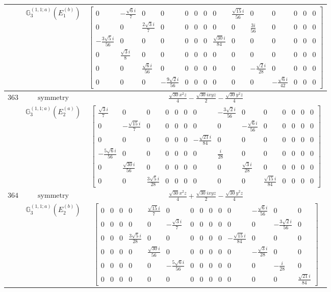 \documentclass[fleqn,8pt,landscape]{jsarticle}
\begin{document}
\begin{longtable}{ccc}
$  $ & $ \mathbb{G}_{3}^{(1,1;a)}(E_{1}^{(b)}) $ & $ \begin{bmatrix} 0 & - \frac{\sqrt{6} i}{7} & 0 & 0 & 0 & 0 & 0 & 0 & \frac{\sqrt{15} i}{56} & 0 & 0 & 0 & 0 & 0 \\ 0 & 0 & \frac{2 \sqrt{3} i}{7} & 0 & 0 & 0 & 0 & 0 & 0 & \frac{3 i}{56} & 0 & 0 & 0 & 0 \\ - \frac{3 \sqrt{5} i}{56} & 0 & 0 & 0 & 0 & 0 & 0 & \frac{\sqrt{30} i}{84} & 0 & 0 & 0 & 0 & 0 & 0 \\ 0 & \frac{\sqrt{3} i}{8} & 0 & 0 & 0 & 0 & 0 & 0 & 0 & 0 & 0 & 0 & 0 & 0 \\ 0 & 0 & \frac{\sqrt{6} i}{56} & 0 & 0 & 0 & 0 & 0 & 0 & - \frac{\sqrt{2} i}{28} & 0 & 0 & 0 & 0 \\ 0 & 0 & 0 & - \frac{9 \sqrt{2} i}{56} & 0 & 0 & 0 & 0 & 0 & 0 & - \frac{\sqrt{6} i}{42} & 0 & 0 & 0 \end{bmatrix} $ \\ \hline
$ 363 $ & $ \text{symmetry} $ & $ \frac{\sqrt{30} x^{2} z}{4} - \frac{\sqrt{30} i x y z}{2} - \frac{\sqrt{30} y^{2} z}{4} $ \\
$  $ & $ \mathbb{G}_{3}^{(1,1;a)}(E_{2}^{(a)}) $ & $ \begin{bmatrix} \frac{\sqrt{3} i}{7} & 0 & 0 & 0 & 0 & 0 & 0 & - \frac{3 \sqrt{2} i}{56} & 0 & 0 & 0 & 0 & 0 & 0 \\ 0 & - \frac{\sqrt{15} i}{7} & 0 & 0 & 0 & 0 & 0 & 0 & - \frac{\sqrt{6} i}{56} & 0 & 0 & 0 & 0 & 0 \\ 0 & 0 & 0 & 0 & 0 & 0 & - \frac{\sqrt{21} i}{84} & 0 & 0 & 0 & 0 & 0 & 0 & 0 \\ - \frac{5 \sqrt{6} i}{56} & 0 & 0 & 0 & 0 & 0 & 0 & \frac{i}{28} & 0 & 0 & 0 & 0 & 0 & 0 \\ 0 & \frac{\sqrt{30} i}{56} & 0 & 0 & 0 & 0 & 0 & 0 & \frac{\sqrt{3} i}{28} & 0 & 0 & 0 & 0 & 0 \\ 0 & 0 & \frac{3 \sqrt{5} i}{28} & 0 & 0 & 0 & 0 & 0 & 0 & \frac{\sqrt{15} i}{84} & 0 & 0 & 0 & 0 \end{bmatrix} $ \\ \hline
$ 364 $ & $ \text{symmetry} $ & $ \frac{\sqrt{30} x^{2} z}{4} + \frac{\sqrt{30} i x y z}{2} - \frac{\sqrt{30} y^{2} z}{4} $ \\
$  $ & $ \mathbb{G}_{3}^{(1,1;a)}(E_{2}^{(b)}) $ & $ \begin{bmatrix} 0 & 0 & 0 & 0 & \frac{\sqrt{15} i}{7} & 0 & 0 & 0 & 0 & 0 & 0 & - \frac{\sqrt{6} i}{56} & 0 & 0 \\ 0 & 0 & 0 & 0 & 0 & - \frac{\sqrt{3} i}{7} & 0 & 0 & 0 & 0 & 0 & 0 & - \frac{3 \sqrt{2} i}{56} & 0 \\ 0 & 0 & 0 & \frac{3 \sqrt{5} i}{28} & 0 & 0 & 0 & 0 & 0 & 0 & - \frac{\sqrt{15} i}{84} & 0 & 0 & 0 \\ 0 & 0 & 0 & 0 & \frac{\sqrt{30} i}{56} & 0 & 0 & 0 & 0 & 0 & 0 & - \frac{\sqrt{3} i}{28} & 0 & 0 \\ 0 & 0 & 0 & 0 & 0 & - \frac{5 \sqrt{6} i}{56} & 0 & 0 & 0 & 0 & 0 & 0 & - \frac{i}{28} & 0 \\ 0 & 0 & 0 & 0 & 0 & 0 & 0 & 0 & 0 & 0 & 0 & 0 & 0 & \frac{\sqrt{21} i}{84} \end{bmatrix} $ \\ \hline

\end{longtable}
\end{document}
